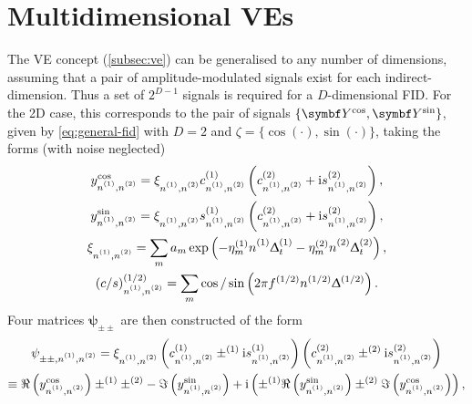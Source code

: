 \section{Multidimensional \aclp{VE}}
\label{sec:multidim-ve}
The \ac{VE} concept (\cref{subsec:ve}) can be generalised to any number
of dimensions, assuming that a pair of amplitude-modulated signals exist for
each indirect-dimension. Thus a set of $2^{D-1}$ signals is required for a
$D$-dimensional \ac{FID}.
For the \ac{2D} case, this corresponds to the pair of signals $\lbrace
\bY^{\cos}, \bY^{\sin} \rbrace$, given by \cref{eq:general-fid} with $D=2$ and
$\zeta = \lbrace \cos(\cdot), \sin(\cdot) \rbrace$, taking the forms (with
noise neglected)
\begin{subequations}
    \begin{gather}
        y^{\cos}_{\none,\ntwo} =
            \xi^{\vphantom{(1)}}_{\none,\ntwo}
            c^{(1)}_{\none,\ntwo}
            \left(c^{(2)}_{\none,\ntwo} + \iu s^{(2)}_{\none,\ntwo}\right),\\
        y^{\sin}_{\none,\ntwo} =
            \xi^{\vphantom{(1)}}_{\none,\ntwo}
            s^{(1)}_{\none,\ntwo}
            \left(c^{(2)}_{\none,\ntwo} + \iu s^{(2)}_{\none,\ntwo}\right),\\
        \xi^{\vphantom{(1)}}_{\none,\ntwo} =
            \sum_m a_m \exp\left(-\etaonem \none \Dtone -\etatwom \ntwo \Dttwo\right),\\
        (c/s)^{(1/2)}_{\none,\ntwo} =
            \sum_m \cos / \sin \left(2 \pi f^{(1/2)} n^{(1/2)} \Updelta^{(1/2)}\right).
    \end{gather}
\end{subequations}
Four matrices $\symbf{\psi}_{\pm\pm}$ are then constructed of the form
\begin{equation}
    \begin{gathered}
        \psi_{\pm\pm, \none, \ntwo} =
            \xi_{\none,\ntwo}^{\vphantom{(1)}}
            \left(c^{(1)}_{\none,\ntwo} \pm^{(1)} \iu s^{(1)}_{\none,\ntwo}\right)
            \left(c^{(2)}_{\none,\ntwo} \pm^{(2)} \iu s^{(2)}_{\none,\ntwo}\right)\\
         \equiv
             \Re\left( y^{\cos}_{\none,\ntwo} \right)
             \pm^{(1)} \pm^{(2)} -
             \Im\left( y^{\sin}_{\none,\ntwo} \right)
             + \iu \left(
             \pm^{(1)}
             \Re\left( y^{\sin}_{\none,\ntwo} \right)
             \pm^{(2)}
             \Im\left( y^{\cos}_{\none,\ntwo} \right)
             \right),
    \end{gathered}
\end{equation}

